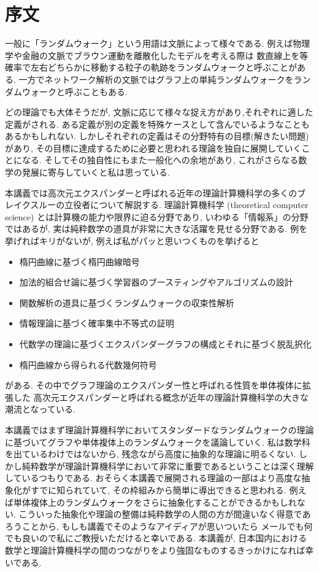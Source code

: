 \chapter*{序文}
一般に「ランダムウォーク」という用語は文脈によって様々である.
例えば物理学や金融の文脈でブラウン運動を離散化したモデルを考える際は
数直線上を等確率で左右どちらかに移動する粒子の軌跡をランダムウォークと呼ぶことがある.
一方でネットワーク解析の文脈ではグラフ上の単純ランダムウォークをランダムウォークと呼ぶこともある.

どの理論でも大体そうだが, 文脈に応じて様々な捉え方があり,それぞれに適した定義がされる.
ある定義が別の定義を特殊ケースとして含んでいるようなこともあるかもしれない.
しかしそれぞれの定義はその分野特有の目標(解きたい問題)があり,
    その目標に達成するために必要と思われる理論を独自に展開していくことになる.
    そしてその独自性にもまた一般化への余地があり,
    これがさらなる数学の発展に寄与していくと私は思っている.

本講義では高次元エクスパンダーと呼ばれる近年の理論計算機科学の多くのブレイクスルーの立役者について解説する.
理論計算機科学 (theoretical computer science) とは計算機の能力や限界に迫る分野であり, いわゆる「情報系」の分野ではあるが,
    実は純粋数学の道具が非常に大きな活躍を見せる分野である.
例を挙げればキリがないが, 例えば私がパッと思いつくものを挙げると
\begin{itemize}
    \item 楕円曲線に基づく楕円曲線暗号
    \item 加法的組合せ論に基づく学習器のブースティングやアルゴリズムの設計
    \item 関数解析の道具に基づくランダムウォークの収束性解析
    \item 情報理論に基づく確率集中不等式の証明
    \item 代数学の理論に基づくエクスパンダーグラフの構成とそれに基づく脱乱択化
    \item 楕円曲線から得られる代数幾何符号
\end{itemize}
がある.
その中でグラフ理論のエクスパンダー性と呼ばれる性質を単体複体に拡張した
    高次元エクスパンダーと呼ばれる概念が近年の理論計算機科学の大きな潮流となっている.

本講義ではまず理論計算機科学においてスタンダードなランダムウォークの理論に基づいてグラフや単体複体上のランダムウォークを議論していく.
私は数学科を出ているわけではないから, 残念ながら高度に抽象的な理論に明るくない.
しかし純粋数学が理論計算機科学において非常に重要であるということは深く理解しているつもりである.
おそらく本講義で展開される理論の一部はより高度な抽象化がすでに知られていて, その枠組みから簡単に導出できると思われる.
例えば単体複体上のランダムウォークをさらに抽象化することができるかもしれない.
こういった抽象化や理論の整備は純粋数学の人間の方が間違いなく得意であろうことから,
もしも講義でそのようなアイディアが思いついたら
メールでも何でも良いので私にご教授いただけると幸いである.
本講義が, 日本国内における数学と理論計算機科学の間のつながりをより強固なものするきっかけになれば幸いである.